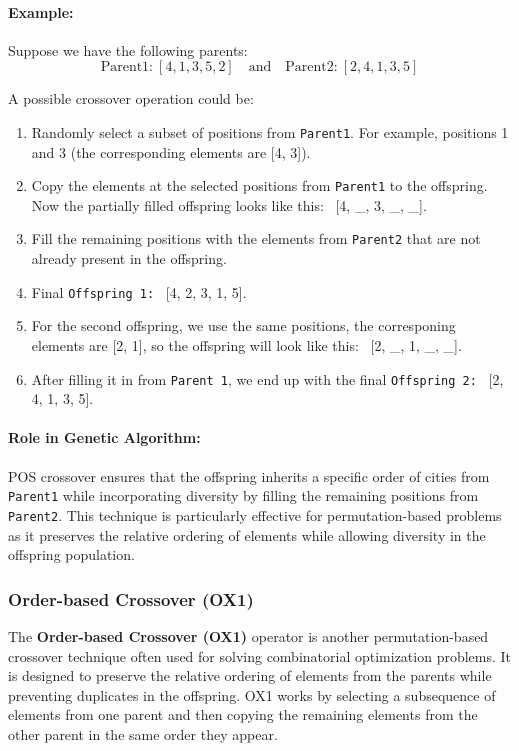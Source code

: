 \documentclass[11pt]{article}
\begin{document}
\paragraph{Example:}

Suppose we have the following parents:
\[
\text{Parent1:} \ [4, 1, 3, 5, 2]
\quad \text{and} \quad \text{Parent2:} \ [2, 4, 1, 3, 5]
\]

A possible crossover operation could be:

\begin{enumerate}
    \item Randomly select a subset of positions from \texttt{Parent1}. For example, positions 1 and 3 (the corresponding elements are [4, 3]).
    \item Copy the elements at the selected positions from \texttt{Parent1} to the offspring. Now the partially filled offspring looks like this: \ [4, \_, 3, \_, \_].
    \item Fill the remaining positions with the elements from \texttt{Parent2} that are not already present in the offspring.
    \item Final \texttt{Offspring 1:} \ [4, 2, 3, 1, 5].
    \item For the second offspring, we use the same positions, the corresponing elements are [2, 1], so the offspring will look like this: \ [2, \_, 1, \_, \_].
    \item After filling it in from \texttt{Parent 1}, we end up with the final \texttt{Offspring 2:} \ [2, 4, 1, 3, 5].
\end{enumerate}



\paragraph{Role in Genetic Algorithm:}

POS crossover ensures that the offspring inherits a specific order of cities from \texttt{Parent1} while incorporating diversity by filling the remaining positions from \texttt{Parent2}. This technique is particularly effective for permutation-based problems as it preserves the relative ordering of elements while allowing diversity in the offspring population.

\subsubsection{Order-based Crossover (OX1)}

The \textbf{Order-based Crossover (OX1)} operator is another permutation-based crossover technique often used for solving combinatorial optimization problems. It is designed to preserve the relative ordering of elements from the parents while preventing duplicates in the offspring. OX1 works by selecting a subsequence of elements from one parent and then copying the remaining elements from the other parent in the same order they appear.
\end{document}
